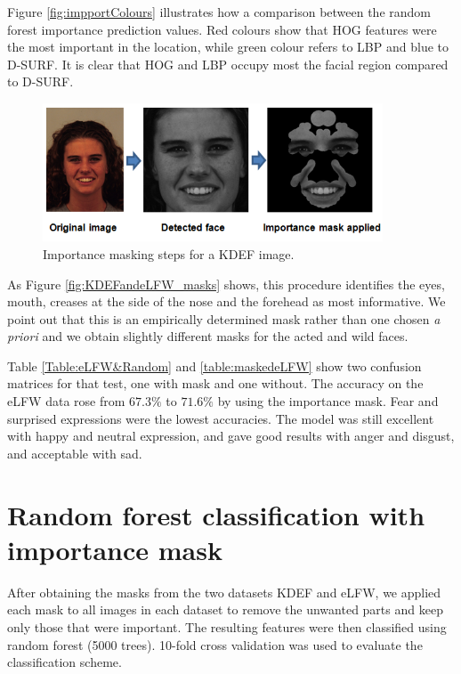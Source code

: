 Figure \ref{fig:impportColours} illustrates how a comparison between the random forest importance prediction values. Red colours show that HOG features were the most important in the location, while green colour refers to LBP and blue to D-SURF. It is clear that HOG and LBP occupy most the facial region compared to D-SURF.   
\begin{figure}[tb]
	\centering
	\includegraphics[width=0.9\textwidth]{Chapter4/Figs/maskingSteps.png}
	\caption{Importance masking steps for a KDEF image.}
	\label{fig:impportSteps}
\end{figure}
As Figure \ref{fig:KDEFandeLFW_masks} shows, this procedure identifies the eyes, mouth, creases at the side of the nose and the forehead as most informative. We point out that this is an empirically determined mask rather than one chosen \textit{a priori} and we obtain slightly different masks for the acted and wild faces. 

Table \ref{Table:eLFW&Random} and \ref{table:maskedeLFW} show two confusion matrices for that test, one with mask and one without. The accuracy on the eLFW data rose from $67.3\%$ to $71.6\%$ by using the importance mask. Fear and surprised expressions were the lowest accuracies. The model was still excellent with happy and neutral expression, and gave good results with anger and disgust, and acceptable with sad.


\section{Random forest classification with importance mask}
\label{sec:RF_mask}
After obtaining the masks from the two datasets KDEF and eLFW, we applied each mask to all images in each dataset to remove the unwanted parts and keep only those that were important. The resulting features were then  classified using random forest (5000 trees). 10-fold cross validation was used to evaluate the classification  scheme.




